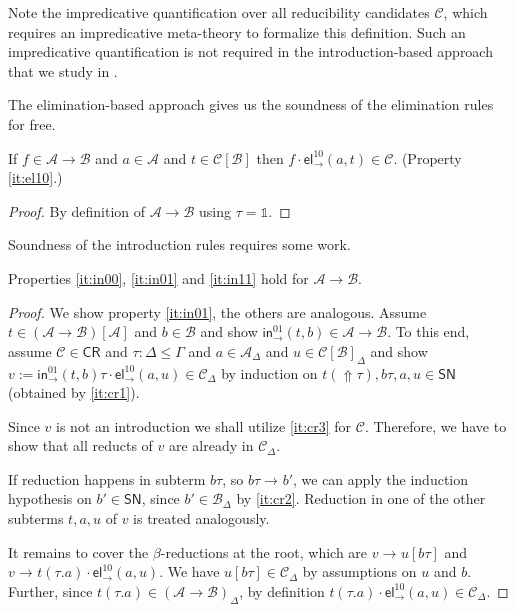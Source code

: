\documentclass[a4paper,USenglish,cleveref, autoref, thm-restate]{lipics-v2019}
\newcommand{\sid}{\mathds{1}}
\newcommand{\tin}{\ensuremath{\mathsf{in}}}
\newcommand{\inn}[2]{\ensuremath{\tin_{#1}^{#2}}}
\newcommand{\tel}{\mathsf{el}}
\newcommand{\el}[2]{\ensuremath{\tel_{#1}^{#2}}}
\newcommand{\red}[1][]{\longrightarrow_{#1}}
\newcommand{\CR}{\mathsf{CR}}
\newcommand{\A}{\mathcal{A}}
\newcommand{\B}{\mathcal{B}}
\newcommand{\C}{\mathcal{C}}
\newcommand{\SN}{\mathsf{SN}}
\newcommand{\Up}{\mathop{\Uparrow}}
\newcommand{\indy}[1]{_{#1}}
\newcommand{\indyp}[2]{(#1)_{#2}}
\newcommand{\ind}[1]{}    %
\newcommand{\indp}[2]{#1} %
\begin{document}
Note the impredicative quantification over all reducibility candidates
$\C$, which requires an impredicative meta-theory to formalize this
definition.  Such an impredicative quantification is not required in
the introduction-based approach that we study in .

The elimination-based approach gives us the soundness of the
elimination rules for free.
\begin{lemma}[Elimination]
  If $f \in \A \to \B$ and $a \in \A$ and $t \in \C[\B]$ then
  $f \cdot \el\to{10}(a,t) \in \C$.
  (Property \ref{it:el10}.)
\end{lemma}
\begin{proof}
  By definition of $\A \to \B$ using $\tau = \sid$.
\end{proof}

Soundness of the introduction rules requires some work.
\begin{lemma}[Introduction]
  Properties \ref{it:in00}, \ref{it:in01} and \ref{it:in11} hold for
  $\A \to \B$.
\end{lemma}
\begin{proof}
  We show property \ref{it:in01}, the others are analogous.  Assume
  $t \in (\A \to \B)[\A]\ind\Gamma$ and $b \in \B\ind\Gamma$ and show
  $\inn\to{01}(t,b) \in \indp{\A \to \B}{\Gamma}$.  To this end, assume
  $\C \in \CR$ and
  $\tau : \Delta \leq \Gamma$ and
  $a \in \A\indy\Delta$ and $u \in \C[\B]\indy\Delta$ and
  show $v := \inn\to{01}(t,b)\tau \cdot \el\to{10}(a,u) \in \C\indy\Delta$ by
  induction on $t(\Up\tau),b\tau,a,u \in \SN$ (obtained by \ref{it:cr1}).

  Since $v$ is not an introduction we shall utilize \ref{it:cr3} for
  $\C$.  Therefore, we have to show that all reducts of $v$ are
  already in $\C\indy\Delta$.

  If reduction happens in subterm $b\tau$, so $b\tau \red b'$, we can apply
  the induction hypothesis on $b' \in \SN$, since $b' \in \B\indy\Delta$
  by \ref{it:cr2}.  Reduction in one of the other subterms $t,a,u$ of
  $v$ is treated analogously.

  It remains to cover the $\beta$-reductions at the root, which are
  $v \red u[b\tau]$ and $v \red t(\tau.a) \cdot \el\to{10}(a,u)$.
  We have $u[b\tau] \in \C\indy\Delta$ by assumptions on $u$ and $b$.  Further, since
  $t(\tau.a) \in \indyp{\A \to \B}{\Delta}$, by definition $t(\tau.a) \cdot
  \el\to{10}(a,u) \in \C\indy\Delta$.
\end{proof}
\end{document}
